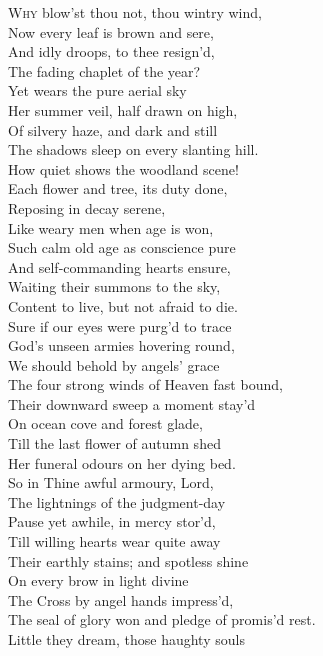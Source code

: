 \textsc{Why} blow’st thou not, thou wintry wind, \\
 Now every leaf is brown and sere, \\
 And idly droops, to thee resign’d, \\
 The fading chaplet of the year? \\
 Yet wears the pure aerial sky \\
 Her summer veil, half drawn on high, \\
 Of silvery haze, and dark and still \\
 The shadows sleep on every slanting hill. \\
  How quiet shows the woodland scene! \\
 Each flower and tree, its duty done, \\
 Reposing in decay serene, \\
 Like weary men when age is won, \\
 Such calm old age as conscience pure \\
 And self-commanding hearts ensure, \\
 Waiting their summons to the sky, \\
 Content to live, but not afraid to die. \\
  Sure if our eyes were purg’d to trace \\
 God’s unseen armies hovering round, \\
 We should behold by angels’ grace \\
 The four strong winds of Heaven fast bound, \\
 Their downward sweep a moment stay’d \\
 On ocean cove and forest glade, \\
 Till the last flower of autumn shed \\
 Her funeral odours on her dying bed. \\
  So in Thine awful armoury, Lord, \\
 The lightnings of the judgment-day \\
 Pause yet awhile, in mercy stor’d, \\
 Till willing hearts wear quite away \\
 Their earthly stains; and spotless shine \\
 On every brow in light divine \\
 The Cross by angel hands impress’d, \\
 The seal of glory won and pledge of promis’d rest.\\
  Little they dream, those haughty souls \\

